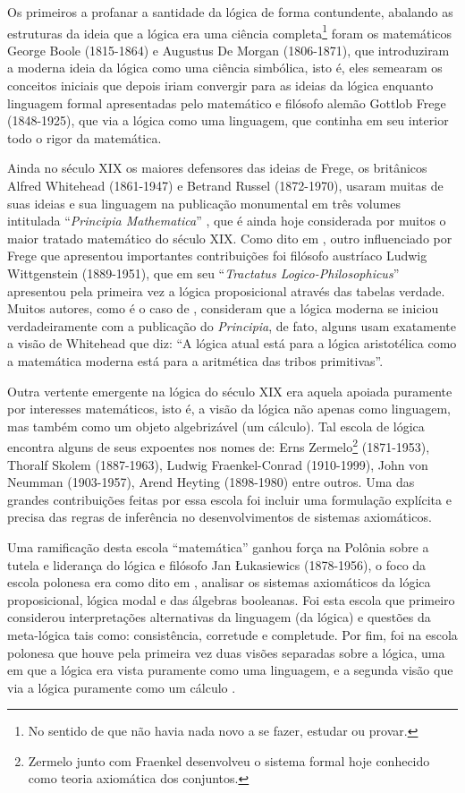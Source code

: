 Os primeiros a profanar a santidade da lógica de forma contundente, abalando as estruturas da ideia que a lógica era uma ciência completa\footnote{No sentido de que não havia nada novo a se fazer, estudar ou provar.} foram os matemáticos George Boole (1815-1864) e Augustus De Morgan (1806-1871), que introduziram a moderna ideia da lógica como uma ciência simbólica, isto é, eles semearam os conceitos iniciais que depois iriam convergir para as ideias da lógica enquanto linguagem formal apresentadas pelo matemático e filósofo alemão Gottlob Frege (1848-1925), que via a lógica como uma linguagem, que continha em seu interior todo o rigor da matemática.

Ainda no século XIX os maiores defensores das ideias de Frege, os britânicos Alfred Whitehead (1861-1947) e Betrand Russel (1872-1970),  usaram muitas de suas ideias e sua linguagem na publicação monumental em três volumes intitulada ``\textit{Principia Mathematica}'' \cite{russel1910principia}, que é ainda hoje considerada por muitos o maior tratado matemático do século XIX. Como dito em \cite{BenjaV1}, outro influenciado por Frege que apresentou importantes contribuições foi filósofo austríaco Ludwig Wittgenstein (1889-1951), que em seu ``\textit{Tractatus Logico-Philosophicus}'' apresentou pela primeira vez a lógica proposicional através das tabelas verdade. Muitos autores, como é o caso de \cite{abe2002-logica}, consideram que a lógica moderna se iniciou verdadeiramente com a publicação do \textit{Principia}, de fato, alguns usam exatamente a visão de Whitehead que diz: ``A lógica atual está para a lógica aristotélica como a matemática moderna está para a aritmética das tribos primitivas''.

Outra vertente emergente na lógica do século XIX era aquela apoiada puramente por interesses matemáticos, isto é, a visão da lógica não apenas como linguagem, mas também como um objeto algebrizável (um cálculo). Tal escola de lógica encontra alguns de seus expoentes nos nomes de: Erns Zermelo\footnote{Zermelo junto com Fraenkel desenvolveu o sistema formal hoje conhecido como teoria axiomática dos conjuntos.} (1871-1953), Thoralf Skolem (1887-1963), Ludwig Fraenkel-Conrad (1910-1999), John von Neumman (1903-1957), Arend Heyting (1898-1980) entre outros. Uma das grandes contribuições feitas por essa escola foi incluir uma formulação explícita e precisa das regras de inferência no desenvolvimentos de sistemas axiomáticos.

Uma ramificação desta escola ``matemática'' ganhou força na Polônia sobre a tutela e liderança do lógica e filósofo Jan \L{}ukasiewics (1878-1956), o foco da escola polonesa era como dito em \cite{BenjaV1}, analisar os sistemas axiomáticos da lógica proposicional, lógica modal e das álgebras booleanas. Foi esta escola que primeiro considerou interpretações alternativas da linguagem (da lógica) e questões da meta-lógica tais como: consistência, corretude e completude. Por fim, foi na escola polonesa que houve pela primeira vez duas visões separadas sobre a lógica, uma em que a lógica era vista puramente como uma linguagem, e a segunda visão que via a lógica puramente como um cálculo \cite{BenjaV1}.

